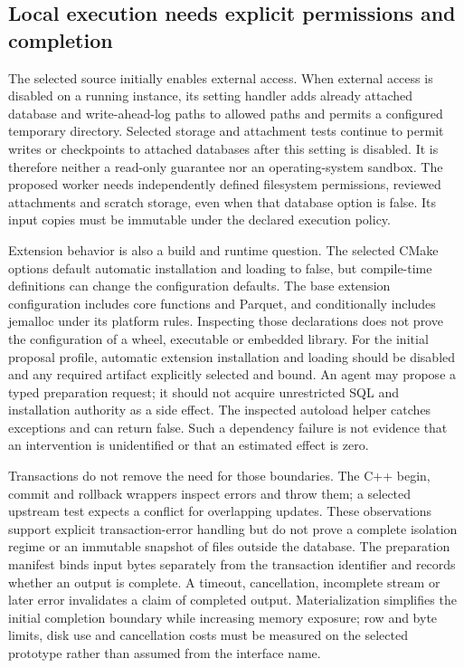 \subsection{Local execution needs explicit permissions and completion}
\label{exec19:duckdb-controls}

The selected source initially enables external access. When external access is
disabled on a running instance, its setting handler adds already attached
database and write-ahead-log paths to allowed paths and permits a configured
temporary directory. Selected storage and attachment tests continue to permit
writes or checkpoints to attached databases after this setting is disabled.
It is therefore neither a read-only guarantee nor an operating-system sandbox.
The proposed worker needs independently defined filesystem permissions,
reviewed attachments and scratch storage, even when that database option is
false. Its input copies must be immutable under the declared execution policy.
\citep{exec19_duckdb_source}

Extension behavior is also a build and runtime question. The selected CMake
options default automatic installation and loading to false, but compile-time
definitions can change the configuration defaults. The base extension
configuration includes core functions and Parquet, and conditionally includes
jemalloc under its platform rules. Inspecting those declarations does not prove
the configuration of a wheel, executable or embedded library. For the initial
proposal profile, automatic extension installation and loading should be
disabled and any required artifact explicitly selected and bound. An agent
may propose a typed preparation request; it should not acquire unrestricted SQL
and installation authority as a side effect. The inspected autoload helper
catches exceptions and can return false. Such a dependency failure is not
evidence that an intervention is unidentified or that an estimated effect is
zero.\citep{exec19_duckdb_source}

Transactions do not remove the need for those boundaries. The C++ begin,
commit and rollback wrappers inspect errors and throw them; a selected upstream
test expects a conflict for overlapping updates. These observations support
explicit transaction-error handling but do not prove a complete isolation
regime or an immutable snapshot of files outside the database. The preparation
manifest binds input bytes separately from the transaction identifier and
records whether an output is complete. A timeout, cancellation, incomplete
stream or later error invalidates a claim of completed output. Materialization
simplifies the initial completion boundary while increasing memory exposure;
row and byte limits, disk use and cancellation costs must be measured on the
selected prototype rather than assumed from the interface name.
\citep{exec19_duckdb_source}

